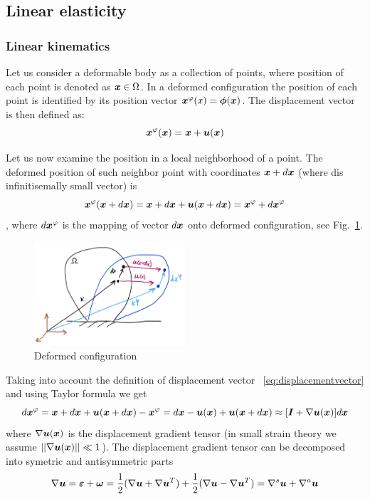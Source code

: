 \subsection{Linear elasticity}
\subsubsection{Linear kinematics}
Let us consider a deformable body as a collection of points, where position of each point is denoted as $\x\in\Omega$. In a deformed configuration the position of each point is identified by its position vector $\xd(x) = \mbf{\phi}(\x)$. The displacement vector is then defined as:
\begin{equation}
  \label{eq:displacementvector}
  \xd(\x) = \x + \du(\x)  
\end{equation}

Let us now examine the position in a local neighborhood of a point. The deformed position of such neighbor point with coordinates $\x+d\x$ (where d\x is infinitisemally small vector) is
$$\xd(\x+d\x) = \x+d\x+\du(\x+d\x) = \xd + d\xd$$,
where $d\xd$ is the mapping of vector $d\x$ onto deformed configuration, see Fig.~\ref{fig:deformedconfiguration}.
\begin{figure}
  \begin{center}
    \includegraphics[width=0.5\textwidth]{figs/deformedconfiguration.png}
  \end{center}
  \label{fig:deformedconfiguration}
  \caption{Deformed configuration}
\end{figure}
Taking into account the definition of displacement vector ~\ref{eq:displacementvector} and using Taylor formula we get
\begin{equation}
  d\xd = \x+d\x+\du(\x+d\x)-\xd = d\x-\du(\x)+\du(\x+d\x) \approx [\mbf{I}+\grad\du(\x)]d\x
\end{equation}
where $\grad\du(\x)$ is the displacement gradient tensor (in small strain theory we assume $\vert\vert\grad\du(\x)\vert\vert \ll 1$).
The displacement gradient tensor can be decomposed into symetric and antisymmetric parts
$$
\grad\du = \mbf{\eps}+\mbf{\omega}={1\over 2}(\grad\du+\grad\du^T)+{1\over 2}(\grad\du-\grad\du^T) = \grad^s\mbf{u}+\grad^a\mbf{u}
$$

